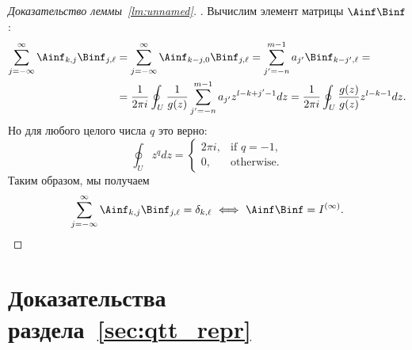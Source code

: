 \begin{proof}[Доказательство леммы~\ref{lm:unnamed}].
	Вычислим элемент матрицы $\Ainf \Binf$:
	\begin{align*}
	\sum_{j=-\infty}^{\infty}\Ainf_{k, j}\Binf_{j, \ell}
	&=
	\sum_{j=-\infty}^{\infty}\Ainf_{k-j, 0}\Binf_{j, \ell}
	=
	\sum_{j'=-n}^{m-1}a_{j'}\Binf_{k-j', \ell}
	=\\&=
	\frac{1}{2\pi i}\oint_U\frac{1}{g(z)}\sum_{j'=-n}^{m-1}a_{j'}z^{l-k+j'-1}dz
	=
	\frac{1}{2\pi i}\oint_U\frac{g(z)}{g(z)}z^{l-k-1}dz.
	\end{align*}
	Но для любого целого числа $q$ это верно:
	\[
	\oint_U z^{q}dz
	=
	\begin{cases}
	2\pi i,&\text{if } q = -1,\\
	0,&\text{otherwise}.
	\end{cases}
	\]
	Таким образом, мы получаем
	\[
	\sum_{j=-\infty}^{\infty}\Ainf_{k, j}\Binf_{j, \ell} = \delta_{k,\ell} ~\Longleftrightarrow~\Ainf \Binf = I^{(\infty)}.
	\]
\end{proof}
\section{Доказательства раздела~\ref{sec:qtt_repr}} \label{app:qtt_repr}

